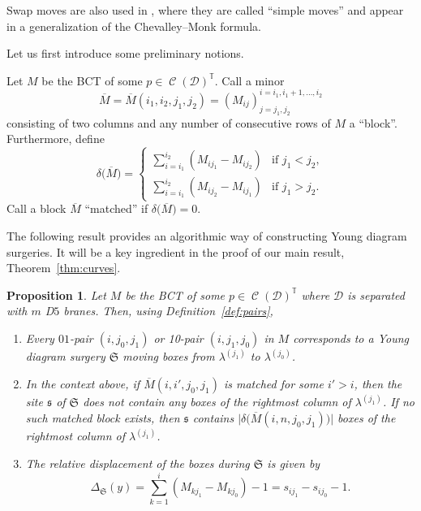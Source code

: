 \documentclass[pdftex]{sigma}
\numberwithin{equation}{section}
\newtheorem{Proposition}[Theorem]{Proposition}
 { \theoremstyle{definition}
\newtheorem{Definition}[Theorem]{Definition}
\newtheorem{Note}[Theorem]{Note}
\newtheorem{Example}[Theorem]{Example}
\newtheorem{Remark}[Theorem]{Remark} }
\newcommand{\brane}{\mathcal D}
\newcommand{\torus}{\mathbb T}
\newcommand{\site}{\mathfrak s}
\newcommand{\surgery}{\mathfrak S}
\DeclareMathOperator{\bowvar}{\mathcal C}
\begin{document}
\begin{Remark}
Swap moves are also used in {\rm\cite{W}}, where they are called ``simple moves'' and appear in a generalization of the Chevalley--Monk formula.
\end{Remark}

Let us first introduce some preliminary notions.

\begin{Definition} \label{def:blocks}
Let $M$ be the BCT of some $p\in\bowvar(\brane)^\torus$. Call a minor
\[
\overline M = \overline{M}(i_1, i_2, j_1, j_2) = \left(M_{ij}\right)^{i = i_1, i_1+1, \dots , i_2}_{j = j_1, j_2}
\]
consisting of two columns and any number of consecutive rows of $M$ a ``block''. Furthermore, define
\[
\delta\bigl(\overline M\bigr) = \begin{cases}
\displaystyle\sum_{i = i_1}^{i_2} (M_{i j_1} - M_{i j_2}) & \text{if }j_1 < j_2, \\
\displaystyle\sum_{i = i_1}^{i_2} (M_{i j_2} - M_{i j_1}) & \text{if }j_1 > j_2.
\end{cases}
\]
Call a block $\overline M$ ``matched'' if $\delta\bigl(\overline M\bigr) = 0$.
\end{Definition}

The following result provides an algorithmic way of constructing Young diagram surgeries. It will be a key ingredient in the proof of our main result, Theorem~\ref{thm:curves}.

\begin{Proposition} \label{prop:BCT_curves}
Let $M$ be the BCT of some $p\in\bowvar(\brane)^\torus$ where $\brane$ is separated with $m$ D$5$ branes. Then, using Definition~{\rm\ref{def:pairs}},
\begin{enumerate}\itemsep=0pt
\item[$(1)$] Every $01$-pair $(i, j_0, j_1)$ or 10-pair $(i, j_1, j_0)$ in $M$ corresponds to a Young diagram surgery $\surgery$ moving boxes from $\lambda^{(j_1)}$ to $\lambda^{(j_0)}$.

\item[$(2)$] In the context above, if $\overline{M}(i, i', j_0, j_1)$ is matched for some $i' > i$, then the site $\site$ of $\surgery$ does not contain any boxes of the rightmost column of $\lambda^{(j_1)}$. If no such matched block exists, then $\site$ contains $\big|\delta\bigl(\overline{M}(i, n, j_0, j_1)\bigr)\big|$ boxes of the rightmost column of $\lambda^{(j_1)}$.

\item[$(3)$] The relative displacement of the boxes during $\surgery$ is given by
\[
\Delta_\surgery(y) = \sum_{k = 1}^{i} (M_{k j_1} - M_{k j_0}) - 1 = s_{i j_1} - s_{i j_0} - 1.
\]
\end{enumerate}
\end{Proposition}
\end{document}
